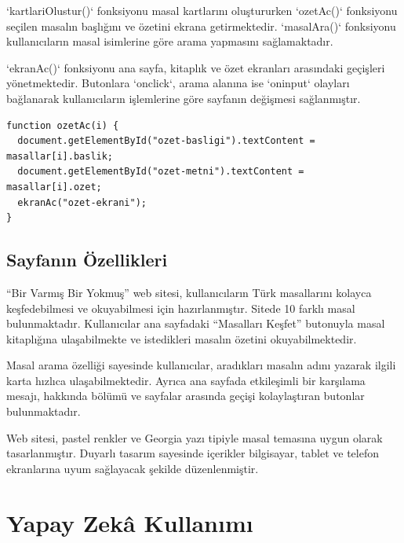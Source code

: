 \documentclass[12pt,a4paper]{article}
\begin{document}
`kartlariOlustur()` fonksiyonu masal kartlarını oluştururken `ozetAc()` fonksiyonu seçilen masalın başlığını ve özetini ekrana getirmektedir. `masalAra()` fonksiyonu kullanıcıların masal isimlerine göre arama yapmasını sağlamaktadır.

`ekranAc()` fonksiyonu ana sayfa, kitaplık ve özet ekranları arasındaki geçişleri yönetmektedir. Butonlara `onclick`, arama alanına ise `oninput` olayları bağlanarak kullanıcıların işlemlerine göre sayfanın değişmesi sağlanmıştır.

\begin{lstlisting}[caption={Seçilen Masalın Özetini Gösterme}]
function ozetAc(i) {
  document.getElementById("ozet-basligi").textContent = masallar[i].baslik;
  document.getElementById("ozet-metni").textContent = masallar[i].ozet;
  ekranAc("ozet-ekrani");
}
\end{lstlisting}

\subsection{Sayfanın Özellikleri}
“Bir Varmış Bir Yokmuş” web sitesi, kullanıcıların Türk masallarını kolayca keşfedebilmesi ve okuyabilmesi için hazırlanmıştır. Sitede 10 farklı masal bulunmaktadır. Kullanıcılar ana sayfadaki “Masalları Keşfet” butonuyla masal kitaplığına ulaşabilmekte ve istedikleri masalın özetini okuyabilmektedir.

Masal arama özelliği sayesinde kullanıcılar, aradıkları masalın adını yazarak ilgili karta hızlıca ulaşabilmektedir. Ayrıca ana sayfada etkileşimli bir karşılama mesajı, hakkında bölümü ve sayfalar arasında geçişi kolaylaştıran butonlar bulunmaktadır.

Web sitesi, pastel renkler ve Georgia yazı tipiyle masal temasına uygun olarak tasarlanmıştır. Duyarlı tasarım sayesinde içerikler bilgisayar, tablet ve telefon ekranlarına uyum sağlayacak şekilde düzenlenmiştir.

\section{Yapay Zekâ Kullanımı}
\end{document}
